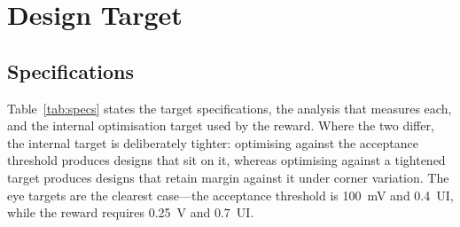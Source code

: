 \documentclass[10pt,a4paper]{article}
\begin{document}


\section{Design Target}
\label{sec:target}

\subsection{Specifications}

Table~\ref{tab:specs} states the target specifications, the analysis that
measures each, and the internal optimisation target used by the reward. Where
the two differ, the internal target is deliberately tighter: optimising against
the acceptance threshold produces designs that sit on it, whereas optimising
against a tightened target produces designs that retain margin against it under
corner variation. The eye targets are the clearest case---the acceptance
threshold is \SI{100}{\milli\volt} and \SI{0.4}{UI}, while the reward requires
\SI{0.25}{\volt} and \SI{0.7}{UI}.
\end{document}
